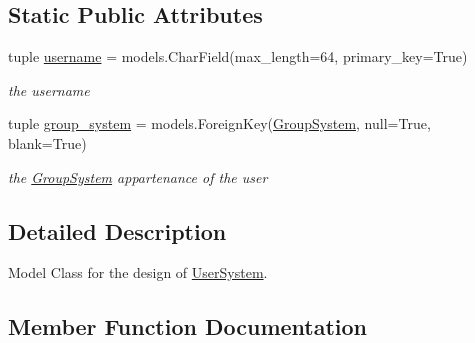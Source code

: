 \subsection*{Static Public Attributes}
\begin{DoxyCompactItemize}
\item 
\hypertarget{classrestriction__system_1_1models_1_1UserSystem_ab715b16a39bb1adef50a8b16d8a49f34}{}tuple \hyperlink{classrestriction__system_1_1models_1_1UserSystem_ab715b16a39bb1adef50a8b16d8a49f34}{username} = models.\+Char\+Field(max\+\_\+length=64, primary\+\_\+key=True)\label{classrestriction__system_1_1models_1_1UserSystem_ab715b16a39bb1adef50a8b16d8a49f34}

\begin{DoxyCompactList}\small\item\em the username \end{DoxyCompactList}\item 
\hypertarget{classrestriction__system_1_1models_1_1UserSystem_ac105a4fde0cdc37632df3f35f96cff70}{}tuple \hyperlink{classrestriction__system_1_1models_1_1UserSystem_ac105a4fde0cdc37632df3f35f96cff70}{group\+\_\+system} = models.\+Foreign\+Key(\hyperlink{classrestriction__system_1_1models_1_1GroupSystem}{Group\+System}, null=True, blank=True)\label{classrestriction__system_1_1models_1_1UserSystem_ac105a4fde0cdc37632df3f35f96cff70}

\begin{DoxyCompactList}\small\item\em the \hyperlink{classrestriction__system_1_1models_1_1GroupSystem}{Group\+System} appartenance of the user \end{DoxyCompactList}\end{DoxyCompactItemize}


\subsection{Detailed Description}
Model Class for the design of \hyperlink{classrestriction__system_1_1models_1_1UserSystem}{User\+System}. 

\subsection{Member Function Documentation}
\hypertarget{classrestriction__system_1_1models_1_1UserSystem_a1f93de0d7eb4be00db2fb67b7a3d7cd0}{}
